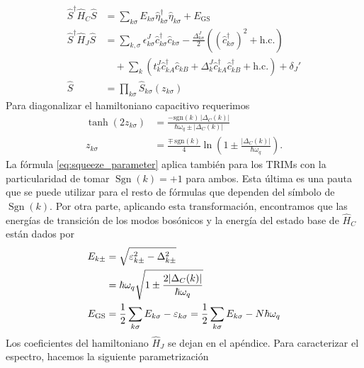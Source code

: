 \begin{subequations}
    \begin{align}
        \hat S^\dag \hat H_C \hat S &= \sum_{k\sigma} E_{k\sigma}\hat \eta_{k\sigma}^\dag \hat \eta_{k\sigma} + E_{\text{GS}}\\
        \hat S^\dag \hat H_J \hat S &= \sum_{k,\sigma}
                \epsilon^J_{k\sigma} \hat c^\dag_{k\sigma}\hat c_{k\sigma} 
                - \frac{\Delta^J_{k\sigma}}{2}\left((\hat c^\dag_{k\sigma})^2 + \text{h.c.}\right) \nonumber\\
               &\quad +\sum_{k}\left(t^J_k\hat c^\dag_{kA} \hat c_{kB} +\Delta^J_k\hat c^\dag_{kA}\hat c_{kB}^\dag+ \text{h.c.}\right) + \delta_{J}'\\
        \hat S &= \prod_{k\sigma} \hat S_{k\sigma}(z_{k\sigma})
    \end{align} \label{eq:squeeze_transform_total}
\end{subequations}
Para diagonalizar el hamiltoniano capacitivo requerimos 
\begin{align}
    \tanh(2z_{k\sigma}) 
        &= \frac{-\mathrm{sgn}(k)\,|\Delta_C(k)|}
               {\hbar\omega_q \pm |\Delta_C(k)|} \nonumber\\
    z_{k\sigma} 
        &= \frac{\mp\,\mathrm{sgn}(k)}{4}
           \ln\!\left(1 \pm \frac{|\Delta_C(k)|}{\hbar\omega_q}\right).
           \label{eq:squeeze_parameter}
\end{align}
La fórmula \eqref{eq:squeeze_parameter} aplica también para los TRIMs con la particularidad de tomar $\operatorname{Sgn}(k) = +1$ para ambos. Esta última es una pauta que se puede utilizar para el resto de fórmulas que dependen del símbolo de $\operatorname{Sgn}(k)$. Por otra parte, aplicando esta transformación, encontramos que las energías de transición de los modos bosónicos y la energía del estado base de $\hat H_C$ están dados por
\begin{subequations}
    \begin{align}
        E_{k\pm} &= \sqrt{\varepsilon_{k\pm}^2 - \Delta_{k\pm}^2}\nonumber\\
        &= \hbar \omega_q \sqrt{1 \pm \frac{2\abs{\Delta_C(k)}}{\hbar \omega_q}}\\
        E_{\text{GS}} &= \frac{1}{2}\sum_{k\sigma}E_{k\sigma} - \varepsilon_{k\sigma} = \frac{1}{2}\sum_{k\sigma}E_{k\sigma} - N \hbar \omega_q
    \end{align}
\end{subequations}
Los coeficientes del hamiltoniano $\hat H_J$ se dejan en el apéndice. Para caracterizar el espectro, hacemos la siguiente parametrización
